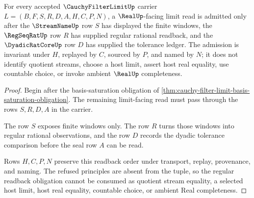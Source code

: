 \begin{theorem}
\label{thm:cauchy-filter-limit-regular-readback-obligation}
For every accepted $\CauchyFilterLimitUp$ carrier $L=(B,F,S,R,D,A,H,C,P,N)$, a $\RealUp$-facing limit read is admitted only after the $\StreamNameUp$ row $S$ has displayed the finite windows, the $\RegSeqRatUp$ row $R$ has supplied regular rational readback, and the $\DyadicRatCoreUp$ row $D$ has supplied the tolerance ledger. The admission is invariant under $H$, replayed by $C$, sourced by $P$, and named by $N$; it does not identify quotient streams, choose a host limit, assert host real equality, use countable choice, or invoke ambient $\RealUp$ completeness.
\end{theorem}
\begin{proof}
Begin after the basis-saturation obligation of \autoref{thm:cauchy-filter-limit-basis-saturation-obligation}. The remaining limit-facing read must pass through the rows $S,R,D,A$ in the carrier.

The row $S$ exposes finite windows only. The row $R$ turns those windows into regular rational observations, and the row $D$ records the dyadic tolerance comparison before the seal row $A$ can be read.

Rows $H,C,P,N$ preserve this readback order under transport, replay, provenance, and naming. The refused principles are absent from the tuple, so the regular readback obligation cannot be consumed as quotient stream equality, a selected host limit, host real equality, countable choice, or ambient Real completeness.
\end{proof}

